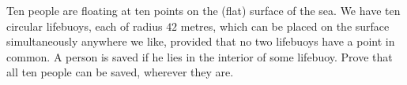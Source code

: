 Ten people are floating at ten points on the (flat) surface of the sea. We have ten circular lifebuoys, each of radius $42$ metres, which can be placed on the surface simultaneously anywhere we like, provided that no two lifebuoys have a point in common. A person is saved if he lies in the interior of some lifebuoy. Prove that all ten people can be saved, wherever they are.
